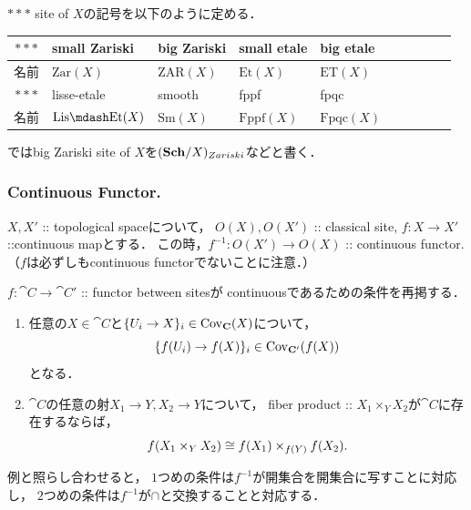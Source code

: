 \begin{Def}
    $***$ site of $X$の記号を以下のように定める．
\begin{table}[ht]
\begin{tabular}{c|lllllllll@{}}
    \toprule
    $***$ & small Zariski     & big Zariski       & small etale      & big etale\\ \midrule
    名前    & $\mathrm{Zar}(X)$ & $\mathrm{ZAR}(X)$ & $\mathrm{Et}(X)$ & $\mathrm{ET}(X)$ \\ \hline \hline
    $***$ & lisse-etale         & smooth           & fppf               & fpqc               \\ \midrule
    名前    & $\mathrm{Lis\mdash Et}(X)$ & $\mathrm{Sm}(X)$ & $\mathrm{Fppf}(X)$ & $\mathrm{Fpqc}(X)$ \\ \bottomrule
\end{tabular}
\end{table}

    \cite{SP}ではbig Zariski site of $X$を$(\mathbf{Sch}/X)_{Zariski}$などと書く．
\end{Def}


\subsubsection{Continuous Functor.}
\begin{Example}
    $X, X'$ :: topological spaceについて，
    $O(X), O(X')$ :: classical site,
    $f \colon X \to X'$ ::continuous mapとする．
    この時，$f^{-1} \colon O(X') \to O(X)$ :: continuous functor.
    （$f$は必ずしもcontinuous functorでないことに注意．）
\end{Example}

\begin{Remark}
    $f \colon \cat{C} \to \cat{C}'$ :: functor between sitesが
    continuousであるための条件を再掲する．
    \begin{enumerate}
        \item 
        任意の$X \in \cat{C}$と$\{U_i \to X\}_i \in \operatorname{Cov}_{\mathbf{C}}(X)$について，
        \[ \{ f(U_i) \to f(X) \}_i \in \operatorname{Cov}_{\mathbf{C}'}(f(X)) \]となる．

        \item
        $\cat{C}$の任意の射$X_1 \to Y, X_2 \to Y$について，
        fiber product :: $X_1 \times_Y X_2$が$\cat{C}$に存在するならば，
        \[ f(X_1 \times_Y X_2) \cong f(X_1) \times_{f(Y)} f(X_2). \]
    \end{enumerate}
    
    例と照らし合わせると，
    $1$つめの条件は$f^{-1}$が開集合を開集合に写すことに対応し，
    $2$つめの条件は$f^{-1}$が$\cap$と交換することと対応する．
\end{Remark}

